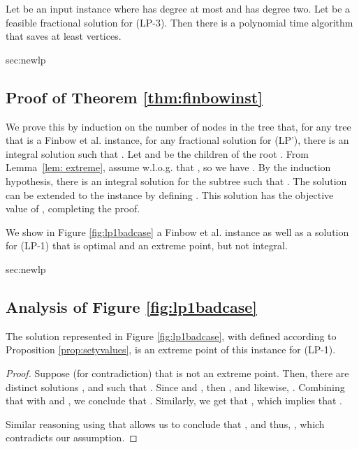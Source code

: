\begin{theorem} 
Let  be an input instance where  has degree at most  and  has degree two. Let  be a feasible fractional solution for (LP-3). 
Then there is a polynomial time algorithm that saves at least  vertices. 
\label{thm:finbowinst}
\end{theorem}  
\begin{appendixproof}{sec:newlp}{\subsection{Proof of Theorem \ref{thm:finbowinst}}}
We prove this by induction on the number of nodes in the tree that, for any tree  that is a Finbow et al. instance, for any fractional solution  for (LP'), there is an integral solution  such that .  
Let  and  be the children of the root .
From Lemma~\ref{lem: extreme}, assume w.l.o.g. that , so we have . 
By the induction hypothesis, there is an integral solution  for the subtree  such that .  
The solution  can be extended to the instance  by defining . 
This solution has the objective value of , completing the proof. 
\end{appendixproof}

We show in Figure \ref{fig:lp1badcase} a Finbow et al. instance as well as a
solution for (LP-1) that is optimal and an extreme point, but not integral.

\begin{appendixextra}{sec:newlp}{\subsection{Analysis of Figure \ref{fig:lp1badcase}}}
\begin{claim}

The solution  represented in Figure \ref{fig:lp1badcase}, with  defined according to
Proposition \ref{prop:setyvalues}, is an extreme point of this instance for
(LP-1).

\end{claim}

\begin{proof}

Suppose (for contradiction) that  is not an extreme point. Then, there
are distinct solutions ,  and  such that
. Since  and , then , and likewise, .
Combining that  with  and
, we conclude that . Similarly, we get that
, which implies that .

Similar reasoning using that  allows us to conclude that
, and thus, , which
contradicts our assumption.
\end{proof}
\end{appendixextra}


